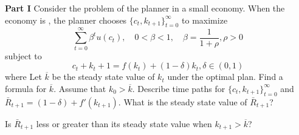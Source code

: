 \vfil\eject

\medskip
{}
 \medskip\noindent
{\bf Part  I}
\medskip \noindent
Consider the problem of the planner in a small economy. When the economy is , the planner chooses $\{c_t,k_{t+1}\}_{t=0}^\infty$ to maximize
$$ \sum_{t=0}^\infty \beta^t u(c_t), \quad  0< \beta<1, \quad  \beta = {{\frac{1}{1+\rho}}}, \rho>0$$
subject to
$$c_t+k_t+1=f(k_t)+(1-\delta)k_t,  \delta \in (0,1)$$
\noindent where%
\medskip
\noindent
Let $\overline{k}$ be the steady state value of $k_t$ under the optimal plan.
\medskip
{} Find a formula for $\overline{k}$.
\medskip
{} Assume that $k_0 > \overline{k}$. Describe time paths for $\{c_t,k_{t+1}\}_{t=0}^\infty$ and $\bar R_{t+1}=(1-\delta) + f'(k_{t+1})$.
\medskip
{} What is the steady state value of $\bar R_{t+1}$?\medskip

 Is $\bar R_{t+1}$ less or greater than its steady state value when $k_{t+1} > \overline{k}$?

